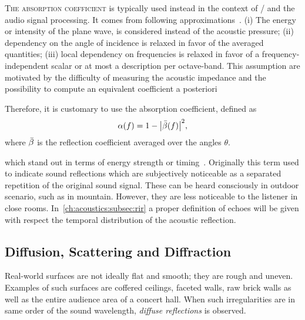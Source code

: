 \textsc{The absorption coefficient} is typically used instead in the context of \GA/ and the audio signal processing.
It comes from following approximations~.
(i) The energy or intensity of the plane wave, is considered instead of the acoustic pressure;
(ii) dependency on the angle of incidence is relaxed in favor of the averaged quantities;
(iii) local dependency on frequencies is relaxed in favor of a frequency-independent scalar or at most a description per octave-band.
This assumption are motivated by the difficulty of measuring the acoustic impedance
and the possibility to compute an equivalent coefficient a posteriori

Therefore, it is customary to use the absorption coefficient, defined as
\begin{equation}
    \absCoeff(f) = 1 - \abs{\bar{\reflCoeff}(f)}^2
    ,
\end{equation}
where $\bar{\beta}$ is the reflection coefficient averaged over the angles $\theta$.

 which stand out in terms of energy strength or timing~.
Originally this term used to indicate sound reflections which are subjectively noticeable as a separated repetition of the original sound signal.
These can be heard consciously in outdoor scenario, such as in mountain. However, they are less noticeable to the listener in close rooms.
In~\cref{ch:acoustics:subsec:rir} a proper definition of echoes will be given with respect the temporal distribution of the acoustic reflection.



\subsection{Diffusion, Scattering and Diffraction}
Real-world surfaces are not ideally flat and smooth; they are rough and uneven.
Examples of such surfaces are coffered ceilings, faceted walls, raw brick walls as well as the entire audience area of a concert hall.
When such irregularities are in same order of the sound wavelength, \textit{diffuse reflections} is observed.

